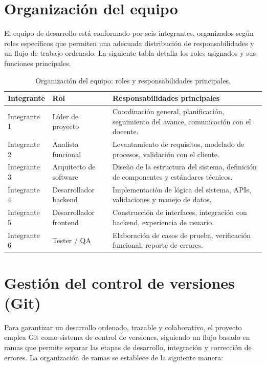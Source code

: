 \documentclass[12pt, a4paper]{article}
\begin{document}
\section{Organización del equipo}
El equipo de desarrollo está conformado por seis integrantes, organizados según roles específicos que permiten una adecuada distribución de responsabilidades y un flujo de trabajo ordenado. La siguiente tabla detalla los roles asignados y sus funciones principales.

\begin{table}[htbp]
  \caption[Organización del equipo]{Organización del equipo: roles y responsabilidades principales.}
  \label{tab:organizacion-equipo}
  \centering
  \singlespacing
  \setlength{\tabcolsep}{4pt}
  \renewcommand{\arraystretch}{1.15}
  \begin{tabularx}{\textwidth}{@{}L{0.20\textwidth} L{0.22\textwidth} Y@{}}
    \toprule
    Integrante & Rol & Responsabilidades principales \\
    \midrule
    Integrante 1 & Líder de proyecto & Coordinación general, planificación, seguimiento del avance, comunicación con el docente. \\
    Integrante 2 & Analista funcional & Levantamiento de requisitos, modelado de procesos, validación con el cliente. \\
    Integrante 3 & Arquitecto de software & Diseño de la estructura del sistema, definición de componentes y estándares técnicos. \\
    Integrante 4 & Desarrollador backend & Implementación de lógica del sistema, APIs, validaciones y manejo de datos. \\
    Integrante 5 & Desarrollador frontend & Construcción de interfaces, integración con backend, experiencia de usuario. \\
    Integrante 6 & Tester / QA & Elaboración de casos de prueba, verificación funcional, reporte de errores. \\
    \bottomrule
  \end{tabularx}
\end{table}

\section{Gestión del control de versiones (Git)}
Para garantizar un desarrollo ordenado, trazable y colaborativo, el proyecto emplea Git como sistema de control de versiones, siguiendo un flujo basado en ramas que permite separar las etapas de desarrollo, integración y corrección de errores. La organización de ramas se establece de la siguiente manera:
\end{document}
